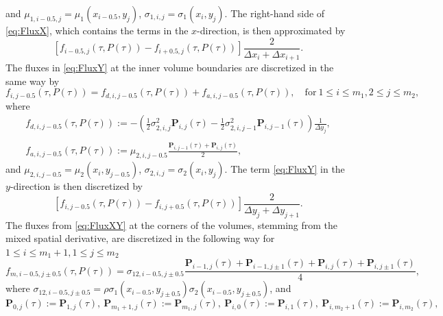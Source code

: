 \documentclass[10pt]{article}
\begin{document}
and $\mu_{1,i-0.5,j} = \mu_{1}(x_{i-0.5},y_{j})$, $\sigma_{1,i,j} = \sigma_{1}(x_{i},y_{j})$.
The right-hand side of \eqref{eq:FluxX}, which contains the terms in the $x$-direction, is then approximated by
$$ \left[ f_{i-0.5,j}(\tau,P(\tau)) - f_{i+0.5,j}(\tau,P(\tau)) \right] \frac{2}{\Delta x_{i}+\Delta x_{i+1}}. $$
The fluxes in \eqref{eq:FluxY} at the inner volume boundaries are discretized in the same way by
\begin{equation}
f_{i,j-0.5}(\tau,P(\tau)) = f_{d,i,j-0.5}(\tau,P(\tau)) + f_{a,i,j-0.5}(\tau,P(\tau)), \quad \mathrm{for} \ 1 \le i \le m_{1}, 2 \le j \le m_{2},
\end{equation}
where
\begin{equation}
\begin{array}{l}
f_{d,i,j-0.5}(\tau,P(\tau)) := -\left( \tfrac{1}{2} \sigma^{2}_{2,i,j} \boldsymbol{P}_{i,j}(\tau) - \tfrac{1}{2} \sigma^{2}_{2,i,j-1} \boldsymbol{P}_{i,j-1}(\tau) \right) \frac{1}{\Delta y_{j}}, \\\\
f_{a,i,j-0.5}(\tau,P(\tau)) := \mu_{2,i,j-0.5} \frac{\boldsymbol{P}_{i,j-1}(\tau)+\boldsymbol{P}_{i,j}(\tau)}{2},
\end{array}
\end{equation}
and $\mu_{2,i,j-0.5} = \mu_{2}(x_{i},y_{j-0.5})$, $\sigma_{2,i,j} = \sigma_{2}(x_{i},y_{j})$. 
The term \eqref{eq:FluxY} in the $y$-direction is then discretized by
$$ \left[ f_{i,j-0.5}(\tau,P(\tau)) - f_{i,j+0.5}(\tau,P(\tau)) \right] \frac{2}{\Delta y_{j}+\Delta y_{j+1}}. $$
The fluxes from \eqref{eq:FluxXY} at the corners of the volumes, stemming from the mixed spatial derivative, are discretized in the following way for $1 \leq i \leq m_{1}+1, 1 \leq j \leq m_{2}$
\begin{equation} f_{m,i-0.5,j\pm0.5}(\tau,P(\tau)) = \sigma_{12,i-0.5,j\pm0.5} \frac{\boldsymbol{P}_{i-1,j}(\tau) + \boldsymbol{P}_{i-1,j\pm 1}(\tau)+\boldsymbol{P}_{i,j}(\tau)+\boldsymbol{P}_{i,j\pm 1}(\tau)}{4},  
\label{eq:DiscrMixedDerivative}
\end{equation}
where $\sigma_{12,i-0.5,j\pm0.5} = \rho \sigma_{1}(x_{i-0.5},y_{j\pm0.5}) \sigma_{2}(x_{i-0.5},y_{j\pm0.5})$, and
\begin{equation}
\boldsymbol{P}_{0,j}(\tau) := \boldsymbol{P}_{1,j}(\tau), \ \boldsymbol{P}_{m_{1}+1,j}(\tau):= \boldsymbol{P}_{m_{1},j}(\tau), \ \boldsymbol{P}_{i,0}(\tau) := \boldsymbol{P}_{i,1}(\tau), \ \boldsymbol{P}_{i,m_{2}+1}(\tau) := \boldsymbol{P}_{i,m_{2}}(\tau),
\label{eq:BoundaryMixedDerivative}
\end{equation}
\end{document}
